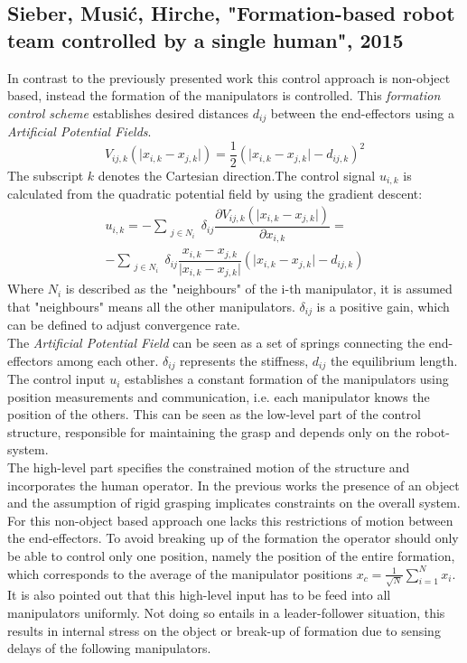\documentclass[conference]{IEEEtran}
\begin{document}
\subsection{Sieber, Musi\'{c}, Hirche, "Formation-based robot team controlled by a single human", 2015 }\label{SS_SieberFormationControl}
In contrast to the previously presented work this control approach is non-object based, instead the formation of the manipulators is controlled. 
This \textit{formation control scheme} establishes desired distances $ d_{ij} $ between the end-effectors using a \textit{Artificial Potential Fields}.
\begin{equation}\label{SieberMusicArtificialPotential}
V_{ij,k}(\vert x_{i,k}-x_{j,k}\vert) = \dfrac{1}{2}(\vert x_{i,k}-x_{j,k}\vert - d_{ij,k})^{2}
\end{equation}
The subscript $ k $ denotes the Cartesian direction.The control signal $ u_{i,k} $ is calculated from the quadratic potential field by using the gradient descent:
\begin{multline}
u_{i,k} = - \sum_{\substack{j\in N_i}}\delta_{ij}\dfrac{\partial V_{ij,k}(\vert x_{i,k}-x_{j,k}\vert)}{\partial x_{i,k}} = \\
- \sum_{\substack{j\in N_i}}\delta_{ij}\dfrac{x_{i,k} - x_{j,k}}{\vert x_{i,k} - x_{j,k} \vert} (\vert x_{i,k}-x_{j,k}\vert - d_{ij,k})
\end{multline}
Where $ N_i $ is described as the "neighbours" of the i-th manipulator, it is assumed that "neighbours" means all the other manipulators. $ \delta_{ij} $ is a positive gain, which can be defined to adjust convergence rate.\\
The \textit{Artificial Potential Field} can be seen as a set of springs connecting the end-effectors among each other. $ \delta_{ij} $ represents the stiffness, $ d_{ij} $ the equilibrium length. 
The control input $ u_i $ establishes a constant formation of the manipulators using position measurements and communication, i.e. each manipulator knows the position of the others. This can be seen as the low-level part of the control structure, responsible for maintaining the grasp and depends only on the robot-system.\\ The high-level part specifies the constrained motion of the structure and incorporates the human operator. In the previous works the presence of an object and the assumption of rigid grasping implicates constraints on the overall system. For this non-object based approach one lacks this restrictions of motion between the end-effectors. To avoid breaking up of the formation the operator should only be able to control only one position, namely the position of the entire formation, which corresponds to the average of the manipulator positions $ x_c = \frac{1}{\sqrt{N}} \sum\nolimits_{i=1}^{N} x_i $. It is also pointed out that this high-level input has to be feed into all manipulators uniformly. Not doing so entails in a leader-follower situation, this results in internal stress on the object or break-up of formation due to sensing delays of the following manipulators.\\
\end{document}

